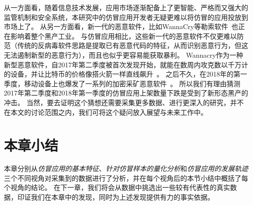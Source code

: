 从一方面看，随着信息技术发展，应用市场逐渐配备上了更智能、严格而又强大的监管机制和安全系统，本研究中的仿冒应用开发者无疑更难以将仿冒的应用投放到市场上了。
从另一方面看，新一代的恶意软件，比如WannaCry等勒索软件~\cite{ransomware}也正在影响着整个黑产工业。
与仿冒应用相比，这些新一代的恶意软件不仅更难以防范（传统的反病毒软件思路是提取已有恶意代码的特征，从而识别恶意行为，但这无法遏制新型的恶意行为），而且也似乎更容易能获取暴利。
Wannacry作为一种新型恶意软件，自2017年第二季度被首次发现开始，就能在数周内攻克数以千万计的设备，并让比特币的价格像搭火箭一样直线飙升~\cite{wannacry_bitcoin_news}。
之后不久，在2018年的第一季度，移动设备上也爆发了一系列的加密采矿恶意软件~\cite{comodo_report}。
所以我们有理由猜测2017年第二季度和2018年第一季度的仿冒应用上架数量下跌是受到了新形态黑产的冲击。
当然，要去证明这个猜想还需要采集更多数据、进行更深入的研究，并不在本文的讨论范围之内，我们可将这个疑问放入展望与未来工作中。

\vspace{5mm}
\noindent{}

\section{本章小结}
本章分别从\emph{仿冒应用的基本特征}、\emph{针对仿冒样本的量化分析}和\emph{仿冒应用的发展轨迹}三个不同视角对采集到的数据进行了分析，并在每个视角后的本节小结中概括了每个视角的结论。
在下一章，我们将会从数据中挑选出一些较有代表性的真实数据，印证我们在本章中的发现，同时为上述发现提供有力的事实依据。
